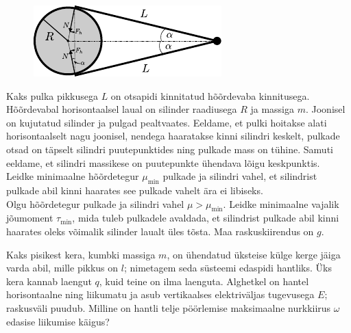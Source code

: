\documentclass[10pt]{article}
\begin{document}
\setAuthor{}

\begin{figure}
  \vspace{-8pt}
  \begin{center}
  \includegraphics[scale=0.9]{2020-v3g-07-yl.pdf}
  \end{center}
  \vspace{-25pt}
\end{figure}
Kaks pulka pikkusega $L$ on otsapidi kinnitatud hõõrdevaba kinnitusega.
Hõõrdevabal horisontaalsel laual on silinder raadiusega $R$ ja massiga $m$.
Joonisel on kujutatud silinder ja pulgad pealtvaates. Eeldame, et pulki hoitakse
alati horisontaalselt nagu joonisel, nendega haaratakse kinni silindri keskelt,
pulkade otsad on täpselt silindri puutepunktides ning pulkade mass on tühine.
Samuti eeldame, et silindri massikese on puutepunkte ühendava lõigu keskpunktis.\\
\osa Leidke minimaalne hõõrdetegur $\mu_{\min}$ pulkade ja silindri vahel,
et silindrist pulkade abil kinni haarates see pulkade vahelt ära ei libiseks.\\
\osa Olgu hõõrdetegur pulkade ja silindri vahel $\mu > \mu_{\min}$. Leidke
minimaalne vajalik jõumoment $\tau_{\min}$, mida tuleb pulkadele avaldada, et
silindrist pulkade abil kinni haarates oleks võimalik silinder laualt üles
tõsta. Maa raskuskiirendus on $g$.
\probend
\bigskip


Kaks pisikest kera, kumbki massiga $m$, on ühendatud üksteise külge kerge jäiga varda abil, mille pikkus on $l$; nimetagem seda süsteemi edaspidi hantliks. Üks kera kannab laengut $q$, kuid teine on ilma laenguta. Alghetkel on hantel horisontaalne ning liikumatu ja asub vertikaalses elektriväljas tugevusega $E$; raskusväli puudub. Milline on hantli telje pöörlemise maksimaalne nurkkiirus $\omega$ edasise liikumise käigus?
\probend
\bigskip

\end{document}
